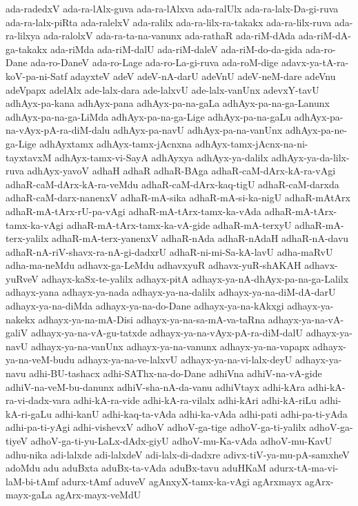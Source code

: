 {ada-radedxV
ada-ra-lAlx-guva
ada-ra-lAlxva
ada-ralUlx
ada-ra-lalx-Da-gi-ruva
ada-ra-lalx-piRta
ada-ralelxV
ada-ralilx
ada-ra-lilx-ra-takakx
ada-ra-lilx-ruva
ada-ra-lilxya
ada-ralolxV
ada-ra-ta-na-vanunx
ada-rathaR
ada-riM-dAda
ada-riM-dA-ga-takakx
ada-riMda
ada-riM-dalU
ada-riM-daleV
ada-riM-do-da-gida
ada-ro-Dane
ada-ro-DaneV
ada-ro-Lage
ada-ro-La-gi-ruva
ada-roM-dige
adavx-ya-tA-ra-koV-pa-ni-Satf
adayxteV
adeV
adeV-nA-darU
adeVnU
adeV-neM-dare
adeVnu
adeVpapx
adelAlx
ade-lalx-dara
ade-lalxvU
ade-lalx-vanUnx
adevxY-tavU
adhAyx-pa-kana
adhAyx-pana
adhAyx-pa-na-gaLa
adhAyx-pa-na-ga-Lanunx
adhAyx-pa-na-ga-LiMda
adhAyx-pa-na-ga-Lige
adhAyx-pa-na-gaLu
adhAyx-pa-na-vAyx-pA-ra-diM-dalu
adhAyx-pa-navU
adhAyx-pa-na-vanUnx
adhAyx-pa-ne-ga-Lige
adhAyxtamx
adhAyx-tamx-jAcnxna
adhAyx-tamx-jAcnx-na-ni-tayxtavxM
adhAyx-tamx-vi-SayA
adhAyxya
adhAyx-ya-dalilx
adhAyx-ya-da-lilx-ruva
adhAyx-yavoV
adhaH
adhaR
adhaR-BAga
adhaR-caM-dArx-kA-ra-vAgi
adhaR-caM-dArx-kA-ra-veMdu
adhaR-caM-dArx-kaq-tigU
adhaR-caM-darxda
adhaR-caM-darx-nanenxV
adhaR-mA-sika
adhaR-mA-si-ka-nigU
adhaR-mAtArx
adhaR-mA-tArx-rU-pa-vAgi
adhaR-mA-tArx-tamx-ka-vAda
adhaR-mA-tArx-tamx-ka-vAgi
adhaR-mA-tArx-tamx-ka-vA-gide
adhaR-mA-terxyU
adhaR-mA-terx-yalilx
adhaR-mA-terx-yanenxV
adhaR-nAda
adhaR-nAdaH
adhaR-nA-davu
adhaR-nA-riV-shavx-ra-nA-gi-dadxrU
adhaR-ni-mi-Sa-kA-lavU
adha-maRvU
adha-ma-neMdu
adhavx-ga-LeMdu
adhavxyuR
adhavx-yuR-shAKAH
adhavx-yuRveV
adhayx-kaSx-te-yalilx
adhayx-pitA
adhayx-ya-nA-dhAyx-pa-na-ga-Lalilx
adhayx-yana
adhayx-ya-nada
adhayx-ya-na-dalilx
adhayx-ya-na-diM-dA-darU
adhayx-ya-na-diMda
adhayx-ya-na-do-Dane
adhayx-ya-na-kAkxgi
adhayx-ya-nakekx
adhayx-ya-na-mA-Disi
adhayx-ya-na-sa-mA-va-taRna
adhayx-ya-na-vA-galiV
adhayx-ya-na-vA-gu-tatxde
adhayx-ya-na-vAyx-pA-ra-diM-dalU
adhayx-ya-navU
adhayx-ya-na-vanUnx
adhayx-ya-na-vanunx
adhayx-ya-na-vapapx
adhayx-ya-na-veM-budu
adhayx-ya-na-ve-lalxvU
adhayx-ya-na-vi-lalx-deyU
adhayx-ya-navu
adhi-BU-tashacx
adhi-SAThx-na-do-Dane
adhiVna
adhiV-na-vA-gide
adhiV-na-veM-bu-danunx
adhiV-sha-nA-da-vanu
adhiVtayx
adhi-kAra
adhi-kA-ra-vi-dadx-vara
adhi-kA-ra-vide
adhi-kA-ra-vilalx
adhi-kAri
adhi-kA-riLu
adhi-kA-ri-gaLu
adhi-kanU
adhi-kaq-ta-vAda
adhi-ka-vAda
adhi-pati
adhi-pa-ti-yAda
adhi-pa-ti-yAgi
adhi-vishevxV
adhoV
adhoV-ga-tige
adhoV-ga-ti-yalilx
adhoV-ga-tiyeV
adhoV-ga-ti-yu-LaLx-dAdx-giyU
adhoV-mu-Ka-vAda
adhoV-mu-KavU
adhu-nika
adi-lalxde
adi-lalxdeV
adi-lalx-di-dadxre
adivx-tiV-ya-mu-pA-samxheV
adoMdu
adu
aduBxta
aduBx-ta-vAda
aduBx-tavu
aduHKaM
adurx-tA-ma-vi-laM-bi-tAmf
adurx-tAmf
aduveV
agAnxyX-tamx-ka-vAgi
agArxmayx
agArx-mayx-gaLa
agArx-mayx-veMdU
}
